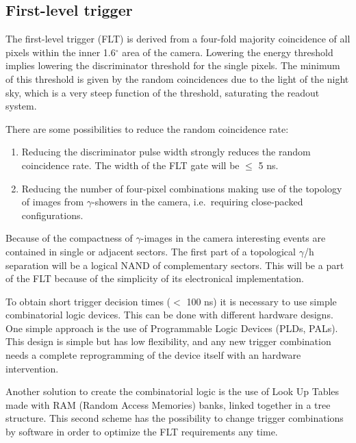\subsection{First-level trigger}


\medskip The first-level trigger (FLT) is derived from a
four-fold majority coincidence of all pixels within the inner 1.6$^{\circ }$
area of the camera. Lowering the energy threshold implies lowering the
discriminator threshold for the single pixels. The minimum of this threshold
is given by the random coincidences due to the light of the night sky,
which is a very steep function of the threshold,
saturating the readout system.

There are some possibilities to reduce the random coincidence rate:

\begin{enumerate}
\item  Reducing the discriminator pulse width strongly reduces the random
coincidence rate. The width of the FLT gate will be $\leq$ 5 ns.

\item  Reducing the number of four-pixel combinations making use of the
topology of images from $\gamma $-showers in the camera,
i.e.\ requiring close-packed configurations.
\end{enumerate}

Because of the compactness of $\gamma$-images in the camera interesting
events are contained in single or adjacent sectors. The first part of a
topological $\gamma$/h separation will be a logical NAND of complementary
sectors. This will be a part of the FLT because of the simplicity of its
electronical implementation.

To obtain short trigger decision times ($<$ 100 ns) it is necessary to use
simple combinatorial logic devices. This can be done with different hardware
designs. One simple approach is the use of Programmable Logic Devices (PLDs, PALs).
This design is simple but has low
flexibility, and any new trigger combination needs a
complete reprogramming of the device itself with an hardware intervention.

Another solution to create the combinatorial logic is the use of
Look Up Tables made with RAM (Random Access Memories) banks, linked together
in a tree structure.
This second scheme has the possibility to change trigger
combinations by software in order to optimize the FLT
requirements any time. 

